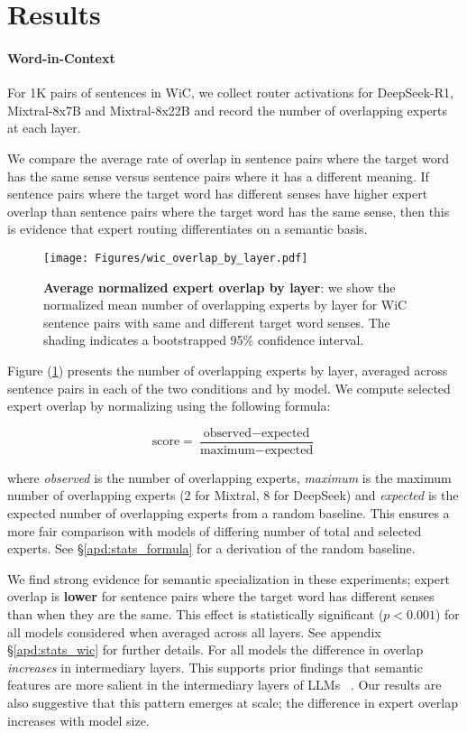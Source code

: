 \section{Results}
\paragraph{Word-in-Context} 
For 1K pairs of sentences in WiC, we collect router activations for DeepSeek-R1, Mixtral-8x7B and Mixtral-8x22B and record the number of overlapping experts at each layer.

We compare the average rate of overlap in sentence pairs where the target word has the same sense versus sentence pairs where it has a different meaning. If sentence pairs where the target word has different senses have higher expert overlap than sentence pairs where the target word has the same sense, then this is evidence that expert routing differentiates on a semantic basis.


\begin{figure}
    \centering
    \texttt{[image: Figures/wic\_overlap\_by\_layer.pdf]}
    \caption{\textbf{Average normalized expert overlap by layer}: we show the normalized mean number of overlapping experts by layer for WiC sentence pairs with same and different target word senses. The shading indicates a bootstrapped 95\% confidence interval.%
    }
    \label{fig:layer_overlap}
\end{figure}


Figure (\ref{fig:layer_overlap}) presents the number of overlapping experts by layer, averaged across sentence pairs in each of the two conditions and by model.
We compute selected expert overlap by normalizing using the following formula:

\begin{equation*}
    \text{score} = \frac{\text{observed} - \text{expected}}{\text{maximum} - \text{expected}}
\end{equation*}

where \textit{observed} is the number of overlapping experts, \textit{maximum} is the maximum number of overlapping experts (2 for Mixtral, 8 for DeepSeek) and \textit{expected} is the expected number of overlapping experts from a random baseline. This ensures a more fair comparison with models of differing number of total and selected experts. See \S\ref{apd:stats_formula} for a derivation of the random baseline.

We find strong evidence for semantic specialization in these experiments; expert overlap is \textbf{lower} for sentence pairs where the target word has different senses than when they are the same. This effect is statistically significant ($p<0.001$) for all models considered when averaged across all layers. See appendix \S\ref{apd:stats_wic} for further details. 
For all models the difference in overlap \textit{increases} in intermediary layers. This supports prior findings that semantic features are more salient in the intermediary layers of LLMs ~\citep{niu2022does, kaplan2024tokens}. %
Our results are also suggestive that this pattern emerges at scale; the difference in expert overlap increases with model size. %





